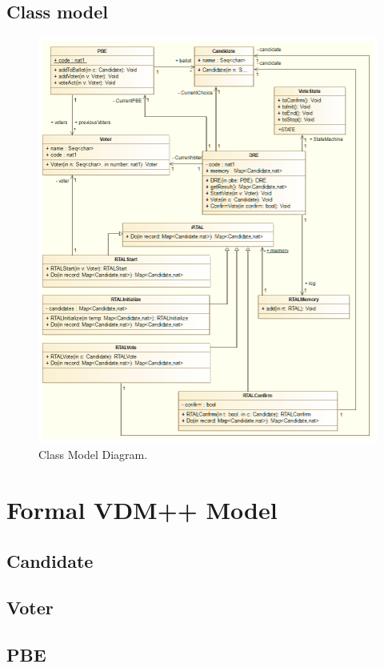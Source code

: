 \documentclass{article}
\begin{document}
\subsection{Class model}
\begin{figure}[!h]
\centering
	\includegraphics[width=\textwidth,height=\textheight,keepaspectratio]{uml.png}
	\caption{Class Model Diagram.}
	\label{fig:PropProf}
\end{figure}
\section{Formal VDM++ Model}\label{xpto}
\subsection{Candidate}

\subsection{Voter}

\subsection{PBE}

\end{document}
